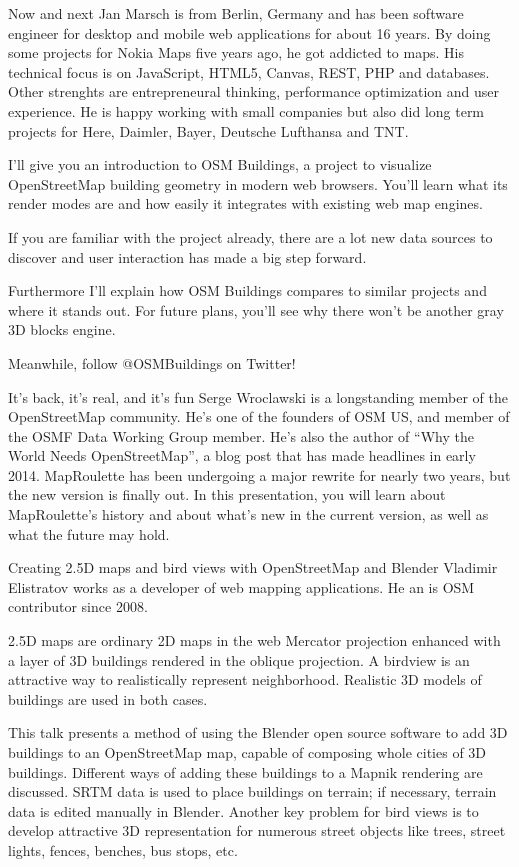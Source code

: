%
{Now and next}%
{Jan Marsch is from Berlin, Germany and has been software engineer for desktop and mobile web applications for about 16 years. By doing some projects for Nokia Maps five years ago, he got addicted to maps. His technical focus is on JavaScript, HTML5, Canvas, REST, PHP and databases. Other strenghts are entrepreneural thinking, performance optimization and user experience. He is happy working with small companies but also did long term projects for Here, Daimler, Bayer, Deutsche Lufthansa and TNT.}%
{I'll give you an introduction to OSM Buildings, a project to visualize OpenStreetMap building geometry in modern web browsers. You'll learn what its render modes are and how easily it integrates with existing web map engines.

If you are familiar with the project already, there are a lot new data sources to discover and user interaction has made a big step forward.

Furthermore I’ll explain how OSM Buildings compares to similar projects and where it stands out. For future plans, you'll see why there won't be another gray 3D blocks engine.

Meanwhile, follow @OSMBuildings on Twitter!}


%
{It's back, it's real, and it's fun}%
{Serge Wroclawski is a longstanding member of the OpenStreetMap community. He's one of the founders of OSM US, and member of the OSMF Data Working Group member. He's also the author of ``Why the World Needs OpenStreetMap'', a blog post that has made headlines in early 2014.}%
{MapRoulette has been undergoing a major rewrite for nearly two years, but the new version is finally out. In this presentation, you will learn about MapRoulette's history and about what's new in the current version, as well as what the future may hold.}

%
{Creating 2.5D maps and bird views with OpenStreetMap and Blender}%
{Vladimir Elistratov works as a developer of web mapping applications. He an is OSM contributor since 2008. }%
{2.5D maps are ordinary 2D maps in the web Mercator projection enhanced with a layer of 3D buildings rendered in the oblique projection. A birdview is an attractive way to realistically represent neighborhood. Realistic 3D models of buildings are used in both cases.

This talk presents a method of using the Blender open source software to add 3D buildings to an OpenStreetMap map, capable of composing whole cities of 3D buildings. Different ways of adding these buildings to a Mapnik rendering are discussed. SRTM data is used to place buildings on terrain; if necessary, terrain data is edited manually in Blender. Another key problem for bird views is to develop attractive 3D representation for numerous street objects like trees, street lights, fences, benches, bus stops, etc.}

